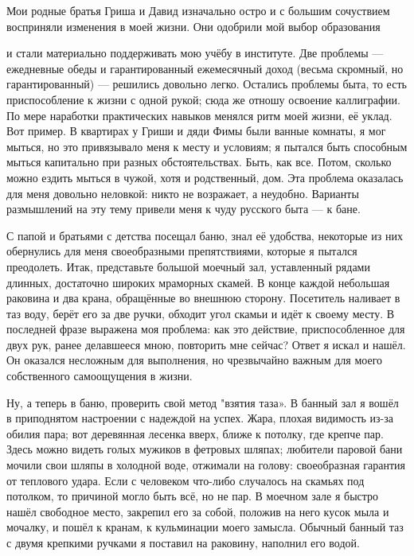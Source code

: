 
\label{277-2}
Мои родные братья Гриша и Давид изначально остро и с большим сочуствием восприняли изменения в моей жизни. Они одобрили мой выбор образования

\label{278-1}
и стали материально поддерживать мою учёбу в институте.
Две проблемы — ежедневные обеды и гарантированный ежемесячный доход (весьма скромный, но гарантированный) — решились довольно легко. Остались проблемы быта, то есть приспособление к жизни с одной рукой; сюда же отношу освоение каллиграфии.
По мере наработки практических навыков менялся ритм моей жизни, её уклад. Вот пример. В квартирах у Гриши и дяди Фимы были ванные комнаты, я мог мыться, но это привязывало меня к месту и условиям; я пытался быть способным мыться капитально при разных обстоятельствах. Быть, как все. Потом, сколько можно ездить мыться в чужой, хотя и родственный, дом. Эта проблема оказалась для меня довольно неловкой: никто не возражает, а неудобно. Варианты размышлений на эту тему привели меня к чуду русского быта — к бане.

\label{279-1}
С папой и братьями с детства посещал баню, знал её удобства, некоторые из них обернулись для меня своеобразными препятствиями, которые я пытался преодолеть. Итак, представьте большой моечный зал, уставленный рядами длинных, достаточно широких мраморных скамей. В конце каждой небольшая раковина и два крана, обращённые во внешнюю сторону. Посетитель наливает в таз воду, берёт его за две ручки, обходит угол скамьи и идёт к своему месту. В последней фразе выражена моя проблема: как это действие, приспособленное для двух рук, ранее делавшееся мною, повторить мне сейчас? Ответ я искал и нашёл. Он оказался несложным для выполнения, но чрезвычайно важным для моего собственного самоощущения в жизни.

\label{280-1}
Ну, а теперь в баню, проверить свой метод "взятия таза». В банный зал я вошёл в приподнятом настроении с надеждой на успех. Жара, плохая видимость из-за обилия пара; вот деревянная лесенка вверх, ближе к потолку, где крепче пар. Здесь можно видеть голых мужиков в фетровых шляпах; любители паровой бани мочили свои шляпы в холодной воде, отжимали на голову: своеобразная гарантия от теплового удара. Если с человеком что-либо случалось на скамьях под потолком, то причиной могло быть всё, но не пар. В моечном зале я быстро нашёл свободное место, закрепил его за собой, положив на него кусок мыла и мочалку, и пошёл к кранам, к кульминации моего замысла. Обычный банный таз с двумя крепкими ручками я поставил на раковину, наполнил его водой.

